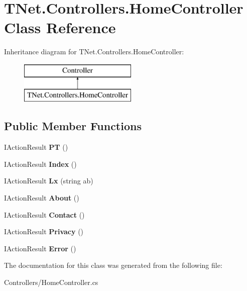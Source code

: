 \hypertarget{class_t_net_1_1_controllers_1_1_home_controller}{}\section{T\+Net.\+Controllers.\+Home\+Controller Class Reference}
\label{class_t_net_1_1_controllers_1_1_home_controller}
Inheritance diagram for T\+Net.\+Controllers.\+Home\+Controller\+:\begin{figure}[H]
\begin{center}
\leavevmode
\includegraphics[height=2.000000cm]{class_t_net_1_1_controllers_1_1_home_controller}
\end{center}
\end{figure}
\subsection*{Public Member Functions}
\begin{DoxyCompactItemize}
\item 
\mbox{\label{class_t_net_1_1_controllers_1_1_home_controller_ae9815a2e9c7e24b04a537947a59c5c54}} 
I\+Action\+Result {\bfseries PT} ()
\item 
\mbox{\label{class_t_net_1_1_controllers_1_1_home_controller_ab2f8beef032a4f9b64ca91579aaaf438}} 
I\+Action\+Result {\bfseries Index} ()
\item 
\mbox{\label{class_t_net_1_1_controllers_1_1_home_controller_a34d449924dfe7e27ca1d1ea4e1b31f1a}} 
I\+Action\+Result {\bfseries Lx} (string ab)
\item 
\mbox{\label{class_t_net_1_1_controllers_1_1_home_controller_a17a1ff15e40e7fc4fd5d325fbaaba19c}} 
I\+Action\+Result {\bfseries About} ()
\item 
\mbox{\label{class_t_net_1_1_controllers_1_1_home_controller_a8a658bd5a84168531028e7d0659f9f80}} 
I\+Action\+Result {\bfseries Contact} ()
\item 
\mbox{\label{class_t_net_1_1_controllers_1_1_home_controller_a8a148184538eda92654697ba08ecc5a7}} 
I\+Action\+Result {\bfseries Privacy} ()
\item 
\mbox{\label{class_t_net_1_1_controllers_1_1_home_controller_a201fef4aa55810d19bc5540f489747a6}} 
I\+Action\+Result {\bfseries Error} ()
\end{DoxyCompactItemize}


The documentation for this class was generated from the following file\+:\begin{DoxyCompactItemize}
\item 
Controllers/Home\+Controller.\+cs\end{DoxyCompactItemize}
